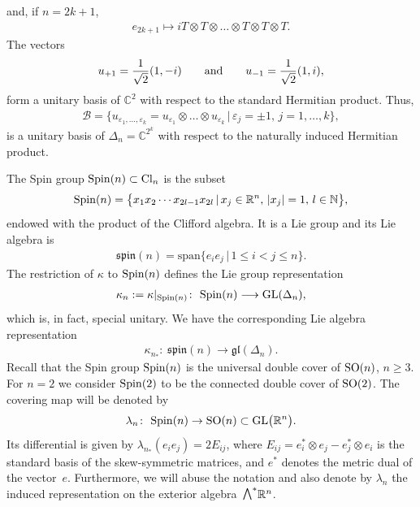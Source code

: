 \documentclass[10pt,a4paper]{amsart}
\newcommand{\ext}{\raise1pt\hbox{$\textstyle\bigwedge$}}
\numberwithin{equation}{section}
\begin{document}
and, if $n=2k+1$,
\begin{gather*} e_{2k+1}\mapsto i T\otimes T\otimes\dots\otimes T\otimes T\otimes T.\end{gather*}
The vectors
\begin{gather*}u_{+1}={1\over \sqrt{2}}(1,-i)\qquad\text{and}\qquad u_{-1}={1\over \sqrt{2}}(1,i),\end{gather*}
form a unitary basis of $\mathbb{C}^2$ with respect to the standard Hermitian product. Thus,{\samepage
\begin{gather*}\mathcal{B}=\{u_{\varepsilon_1,\dots,\varepsilon_k}=u_{\varepsilon_1}\otimes\dots\otimes
u_{\varepsilon_k}\,|\, \varepsilon_j=\pm 1,\, j=1,\dots,k\},\end{gather*}
is a unitary basis of $\Delta_n=\mathbb{C}^{2^k}$ with respect to the naturally induced Hermitian product.}

The Spin group ${\rm Spin}(n)\subset {\rm Cl}_n$ is the subset
\begin{gather*}{\rm Spin}(n) =\big\{x_1x_2\cdots x_{2l-1}x_{2l}\,|\,x_j\in\mathbb{R}^n, \,
|x_j|=1,\, l\in\mathbb{N}\big\},\end{gather*}
endowed with the product of the Clif\/ford algebra. It is a Lie group and its Lie algebra is
\begin{gather*}\mathfrak{spin}(n)=\mbox{span}\{e_ie_j\,|\,1\leq i< j \leq n\}.\end{gather*}
The restriction of $\kappa$ to ${\rm Spin}(n)$ def\/ines the Lie group representation
\begin{gather*}\kappa_n:=\kappa|_{{\rm Spin}(n)}\colon \ {\rm Spin}(n)\longrightarrow {\rm GL}(\Delta_n),\end{gather*}
which is, in fact, special unitary. We have the corresponding Lie algebra representation
\begin{gather*}\kappa_{n_*}\colon \ \mathfrak{spin}(n)\longrightarrow \mathfrak{gl}(\Delta_n).\end{gather*}
Recall that the Spin group ${\rm Spin}(n)$ is the universal double cover of ${\rm SO}(n)$, $n\ge 3$. For $n=2$ we consider ${\rm Spin}(2)$ to be the connected double cover of ${\rm SO}(2)$. The covering map will be denoted by
\begin{gather*}\lambda_n\colon \ {\rm Spin}(n)\rightarrow {\rm SO}(n)\subset {\rm GL}\big(\mathbb{R}^n\big).\end{gather*}
Its dif\/ferential is given by $\lambda_{n_*}(e_ie_j) = 2E_{ij}$, where $E_{ij}=e_i^*\otimes e_j - e_j^*\otimes e_i$ is the standard basis of the skew-symmetric matrices, and $e^*$ denotes the metric dual of the vector~$e$. Furthermore, we will abuse the notation and also denote by $\lambda_n$ the induced representation on the exterior algebra~$\ext^*\mathbb{R}^n$.
\end{document}
